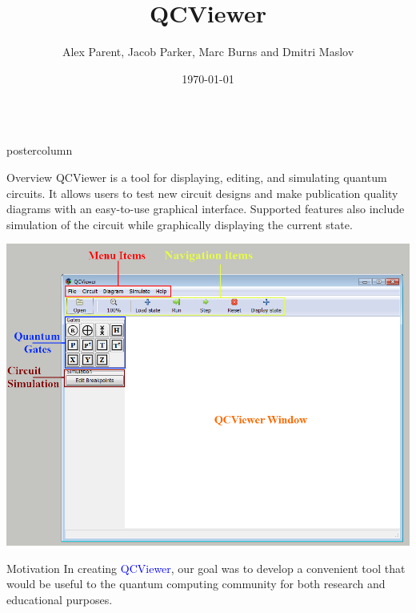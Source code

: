 \documentclass[final]{beamer} %
\title[QCViewer]{QCViewer}
\author[Author]{Alex Parent, Jacob Parker, Marc Burns and Dmitri Maslov}
\institute[IQC, University of Waterloo]{Quantum Circuits group, IQC, University of Waterloo}
\date{\today}
\begin{document}
    \begin{frame}{} 
    \begin{columns}
        \begin{column}{.33\textwidth}
        \begin{beamercolorbox}[center,wd=\textwidth]{postercolumn}
        \begin{minipage}[c][0.95\textheight][s]{0.95\columnwidth}
            \begin{block}{\large Overview}
	            QCViewer is a tool for displaying, editing, and simulating quantum circuits. 
                It allows users to test new circuit designs and make publication quality diagrams with an easy-to-use graphical interface. 
                Supported features also include simulation of the circuit while graphically displaying the current state.
                \begin{center} 
                    \includegraphics{figures/QCViewerGUI.png}
                \end{center}
            \end{block}
            \vfill
            \begin{block}{\large Motivation}
                In creating \textcolor{blue}{QCViewer}, our goal was to develop a convenient tool that would be useful to the quantum computing community for both research and educational purposes. 


\end{block}
\end{minipage}
\end{beamercolorbox}
\end{column}
\end{columns}
\end{frame}
\end{document}
